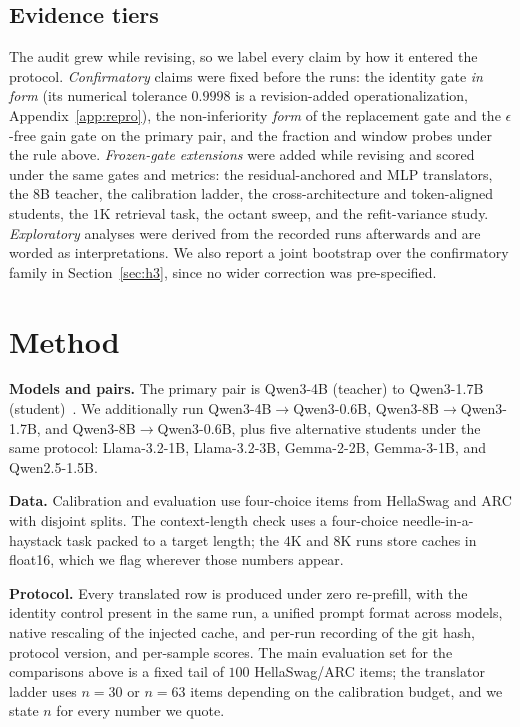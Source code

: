 \documentclass[10pt]{article}
\begin{document}
\subsection{Evidence tiers}
\label{sec:tiers}
The audit grew while revising, so we label every claim by how it entered the
protocol. \emph{Confirmatory} claims were fixed before the runs: the identity
gate \emph{in form} (its numerical tolerance $0.9998$ is a revision-added
operationalization, Appendix~\ref{app:repro}), the non-inferiority
\emph{form} of the replacement gate and the
$\epsilon$-free gain gate on the primary pair, and the fraction and window
probes under the rule above. \emph{Frozen-gate extensions} were added while
revising and scored under the same gates and metrics: the residual-anchored and
MLP translators, the $8$B teacher, the calibration ladder, the
cross-architecture and token-aligned students, the $1$K retrieval task, the
octant sweep, and the refit-variance study. \emph{Exploratory} analyses were
derived from the recorded runs afterwards and are worded as interpretations. We
also report a joint bootstrap over the confirmatory family in
Section~\ref{sec:h3}, since no wider correction was pre-specified.


\section{Method}
\label{sec:method}

\textbf{Models and pairs.} The primary pair is Qwen3-4B (teacher) to Qwen3-1.7B
(student)~\citep{qwen3}. We additionally run Qwen3-4B$\to$Qwen3-0.6B, Qwen3-8B$\to$Qwen3-1.7B,
and Qwen3-8B$\to$Qwen3-0.6B, plus five alternative students under the same
protocol: Llama-3.2-1B, Llama-3.2-3B, Gemma-2-2B, Gemma-3-1B, and Qwen2.5-1.5B.

\textbf{Data.} Calibration and evaluation use four-choice items from HellaSwag
and ARC with disjoint splits. The context-length check uses a four-choice
needle-in-a-haystack task packed to a target length; the $4$K and $8$K runs
store caches in float16, which we flag wherever those numbers appear.

\textbf{Protocol.} Every translated row is produced under zero re-prefill, with
the identity control present in the same run, a unified prompt format across
models, native rescaling of the injected cache, and per-run recording of the git
hash, protocol version, and per-sample scores. The main evaluation set for the
comparisons above is a fixed tail of $100$ HellaSwag/ARC items; the translator
ladder uses $n=30$ or $n=63$ items depending on the calibration budget, and we
state $n$ for every number we quote.
\end{document}

